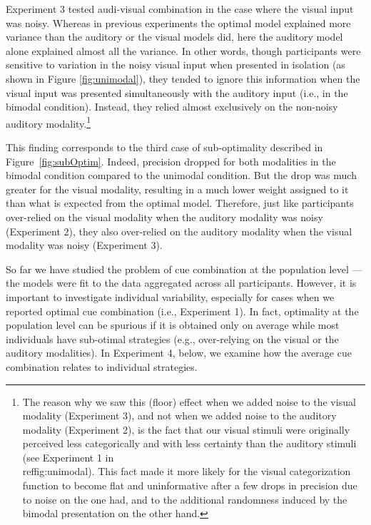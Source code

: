 \documentclass[english,,man,floatsintext]{apa6}
\let\rmarkdownfootnote\footnote%
\def\footnote{\protect\rmarkdownfootnote}
\theoremstyle{definition}
\theoremstyle{definition}
\theoremstyle{definition}
\theoremstyle{remark}
\begin{document}
Experiment 3 tested audi-visual combination in the case where the visual
input was noisy. Whereas in previous experiments the optimal model
explained more variance than the auditory or the visual models did, here
the auditory model alone explained almost all the variance. In other
words, though participants were sensitive to variation in the noisy
visual input when presented in isolation (as shown in Figure
\ref{fig:unimodal}), they tended to ignore this information when the
visual input was presented simultaneously with the auditory input (i.e.,
in the bimodal condition). Instead, they relied almost exclusively on
the non-noisy auditory
modality.\footnote{The reason why we saw this (floor) effect when we added noise to the visual modality (Experiment 3), and not when we added noise to the auditory modality (Experiment 2), is the fact that our visual stimuli were originally perceived less categorically and with less certainty than the auditory stimuli (see Experiment 1 in \\ref{fig:unimodal}). This fact made it more likely for the visual categorization function to become flat and uninformative after a few drops in precision due to noise on the one had, and to the additional randomness induced by the bimodal presentation on the other hand.}

This finding corresponds to the third case of sub-optimality described
in Figure~\ref{fig:subOptim}. Indeed, precision dropped for both
modalities in the bimodal condition compared to the unimodal condition.
But the drop was much greater for the visual modality, resulting in a
much lower weight assigned to it than what is expected from the optimal
model. Therefore, just like participants over-relied on the visual
modality when the auditory modality was noisy (Experiment 2), they also
over-relied on the auditory modality when the visual modality was noisy
(Experiment 3).

So far we have studied the problem of cue combination at the population
level --- the models were fit to the data aggregated across all
participants. However, it is important to investigate individual
variability, especially for cases when we reported optimal cue
combination (i.e., Experiment 1). In fact, optimality at the population
level can be spurious if it is obtained only on average while most
individuals have sub-otimal strategies (e.g., over-relying on the visual
or the auditory modalities). In Experiment 4, below, we examine how the
average cue combination relates to individual strategies.
\end{document}
